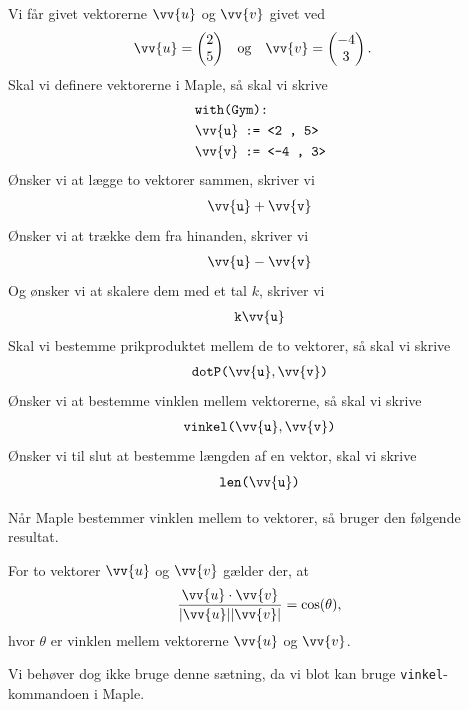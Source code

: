 \begin{exa}
	Vi får givet vektorerne $\vv{u}$ og $\vv{v}$ givet ved
	\begin{align*}
		&\vv{u} = 
		\begin{pmatrix} 
			2 \\ 5
		\end{pmatrix} & &\textnormal{og} & & 
		\vv{v} = 
		\begin{pmatrix}
			-4 \\ 3
		\end{pmatrix}. 
	\end{align*}
	Skal vi definere vektorerne i Maple, så skal vi skrive
	\begin{align*}
		&\texttt{with(Gym):} \\
		&\texttt{$\vv{\texttt{u}}$ := <2 , 5>} \\
		&\texttt{$\vv{\texttt{v}}$ := <-4 , 3>}
	\end{align*}
	Ønsker vi at lægge to vektorer sammen, skriver vi
	\begin{align*}
		\vv{\texttt{u}} + \vv{\texttt{v}}
	\end{align*}
	Ønsker vi at trække dem fra hinanden, skriver vi
	\begin{align*}
		\vv{\texttt{u}} - \vv{\texttt{v}}
	\end{align*}
	Og ønsker vi at skalere dem med et tal $k$, skriver vi
	\begin{align*}
		\texttt{k$\vv{\texttt{u}}$}
	\end{align*}
	Skal vi bestemme prikproduktet mellem de to vektorer, så skal vi skrive
	\begin{align*}
		\texttt{dotP($\vv{\texttt{u}},\vv{\texttt{v}}$)} 
	\end{align*}
	Ønsker vi at bestemme vinklen mellem vektorerne, så skal vi skrive
	\begin{align*}
		\texttt{vinkel($\vv{\texttt{u}},\vv{\texttt{v}}$)}
	\end{align*}
	Ønsker vi til slut at bestemme længden af en vektor, skal vi skrive
	\begin{align*}
		\texttt{len($\vv{\texttt{u}}$)}
	\end{align*}
\end{exa}

Når Maple bestemmer vinklen mellem to vektorer, så bruger den følgende resultat.
\newpage
\begin{setn}
	For to vektorer $\vv{u}$ og $\vv{v}$ gælder der, at 
	\begin{align*}
		\frac{\vv{u}\cdot \vv{v}}{|\vv{u}||\vv{v}|} = \cos(\theta),
	\end{align*}
	hvor $\theta$ er vinklen mellem vektorerne $\vv{u}$ og $\vv{v}$.
\end{setn}
Vi behøver dog ikke bruge denne sætning, da vi blot kan bruge \texttt{vinkel}-kommandoen i Maple.



